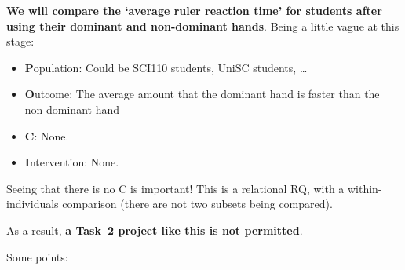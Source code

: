 \documentclass[
  11pt,
  a4paper,
  krantz2]{krantz}
\providecommand{\tightlist}{%
  \setlength{\itemsep}{0pt}\setlength{\parskip}{0pt}}
\begin{document}
\textbf{We will compare the `average ruler reaction time' for students after using their dominant and non-dominant hands}.
Being a little vague at this stage:

\begin{itemize}
\tightlist
\item
  \textbf{P}opulation: Could be SCI110 students, UniSC students, \ldots{}
\item
  \textbf{O}utcome: The average amount that the dominant hand is faster than the non-dominant hand
\item
  \textbf{C}: None.
\item
  \textbf{I}ntervention: None.
\end{itemize}

Seeing that there is no C is important!
This is a relational RQ, with a within-individuals comparison (there are not two subsets being compared).

As a result, \textbf{a Task~2 project like this is not permitted}.

Some points:
\end{document}
